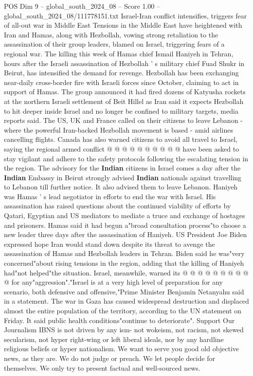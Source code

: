 \begin{textsample}{POS Dim 9 – global\_south\_2024\_08 – Score 1.00 – global\_south\_2024\_08/111778151.txt}  \label{ex:f9_pos_057}
Israel-Iran conflict intensifies, triggers fear of all-out war in Middle East Tensions in the Middle East have heightened with Iran and Hamas, along with Hezbollah, vowing strong retaliation to the assassination of their group leaders, blamed on Israel, triggering fears of a regional war.
The killing this week of Hamas chief Ismail Haniyeh in Tehran, hours after the Israeli assassination of Hezbollah ' s military chief Fuad Shukr in Beirut, has intensified the demand for revenge.
Hezbollah has been exchanging near-daily cross-border fire with Israeli forces since October, claiming to act in support of Hamas.
The group announced it had fired dozens of Katyusha rockets at the northern Israeli settlement of Beit Hillel as Iran said it expects Hezbollah to hit deeper inside Israel and no longer be confined to military targets, media reports said.
The US, UK and France called on their citizens to leave Lebanon - where the powerful Iran-backed Hezbollah movement is based - amid airlines cancelling flights.
Canada has also warned citizens to avoid all travel to Israel, saying the regional armed conflict @ @ @ @ @ @ @ @ @ @ have been asked to stay vigilant and adhere to the safety protocols following the escalating tension in the region.
The advisory for the \textbf{Indian} citizens in Israel comes a day after the \textbf{Indian} Embassy in Beirut strongly advised \textbf{Indian} nationals against travelling to Lebanon till further notice.
It also advised them to leave Lebanon.
Haniyeh was Hamas ' s lead negotiator in efforts to end the war with Israel.
His assassination has raised questions about the continued viability of efforts by Qatari, Egyptian and US mediators to mediate a truce and exchange of hostages and prisoners.
Hamas said it had begun a"broad consultation process"to choose a new leader three days after the assassination of Haniyeh.
US President Joe Biden expressed hope Iran would stand down despite its threat to avenge the assassination of Hamas and Hezbollah leaders in Tehran.
Biden said he was"very concerned"about rising tensions in the region, adding that the killing of Haniyeh had"not helped"the situation.
Israel, meanwhile, warned its @ @ @ @ @ @ @ @ @ @ for any"aggression"."Israel is at a very high level of preparation for any scenario, both defensive and offensive,"Prime Minister Benjamin Netanyahu said in a statement.
The war in Gaza has caused widespread destruction and displaced almost the entire population of the territory, according to the UN statement on Friday.
It said public health conditions"continue to deteriorate".
Support Our Journalism IBNS is not driven by any ism- not wokeism, not racism, not skewed secularism, not hyper right-wing or left liberal ideals, nor by any hardline religious beliefs or hyper nationalism.
We want to serve you good old objective news, as they are.
We do not judge or preach.
We let people decide for themselves.
We only try to present factual and well-sourced news.

\end{textsample}
